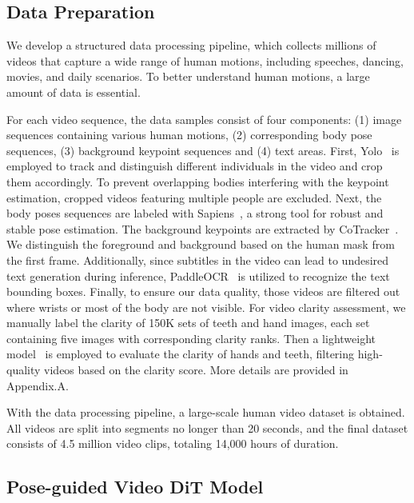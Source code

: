 \subsection{Data Preparation}
\label{subsec:data}

We develop a structured data processing pipeline, which collects millions of videos that capture a wide range of human motions, including speeches, dancing, movies, and daily scenarios. To better understand human motions, a large amount of data is essential.

For each video sequence, the data samples consist of four components: (1) image sequences containing various human motions, (2) corresponding body pose sequences, (3) background keypoint sequences and (4) text areas. First, Yolo~\cite{Jocher_Ultralytics_YOLO_2023} is employed to track and distinguish different individuals in the video and crop them accordingly. To prevent overlapping bodies interfering with the keypoint estimation, cropped videos featuring multiple people are excluded. Next, the body poses sequences are labeled with Sapiens~\cite{khirodkar2024sapiens}, a strong tool for robust and stable pose estimation. The background keypoints are extracted by CoTracker~\cite{karaev2023cotracker}. We distinguish the foreground and background based on the human mask from the first frame. Additionally, since subtitles in the video can lead to undesired text generation during inference, PaddleOCR~\cite{PaddleOCR} is utilized to recognize the text bounding boxes. Finally, to ensure our data quality, those videos are filtered out where wrists or most of the body are not visible. For video clarity assessment, we manually label the clarity of 150K sets of teeth and hand images, each set containing five images with corresponding clarity ranks. Then a lightweight model~\cite{he2016deep} is employed to evaluate the clarity of hands and teeth, filtering high-quality videos based on the clarity score. More details are provided in Appendix.A.

With the data processing pipeline, a large-scale human video dataset is obtained. All videos are split into segments no longer than 20 seconds, and the final dataset consists of 4.5 million video clips, totaling 14,000 hours of duration.

\subsection{Pose-guided Video DiT Model} %
\label{subsec:dit}

